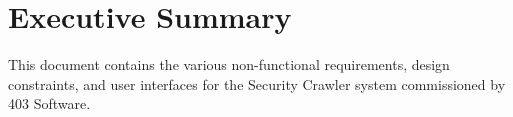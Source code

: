 \section{Executive Summary}
	This document contains the various non-functional requirements, design constraints, and user interfaces for the Security Crawler system commissioned by 403 Software.  
